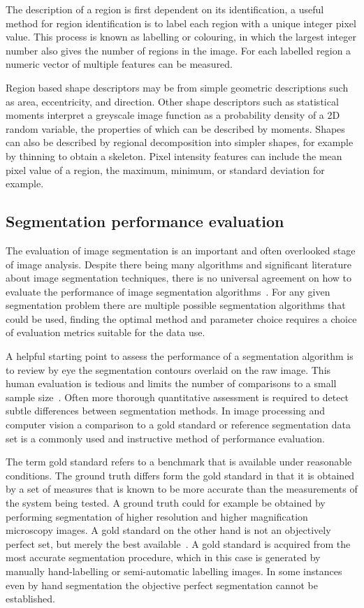 The description of a region is first dependent on its identification, a useful method for region identification is to label each region with a unique integer pixel value. This process is known as labelling or colouring, in which the largest integer number also gives the number of regions in the image. For each labelled region a numeric vector of multiple features can be measured.

Region based shape descriptors may be from simple geometric descriptions such as area, eccentricity, and direction. Other shape descriptors such as statistical moments interpret a greyscale image function as a probability density of a 2D random variable, the properties of which can be described by moments. Shapes can also be described by regional decomposition into simpler shapes, for example by thinning to obtain a skeleton. Pixel intensity features can include the mean pixel value of a region, the maximum, minimum, or standard deviation for example.

\subsection{Segmentation performance evaluation}
\label{introduction:image_processing:performance_evaluation}
The evaluation of image segmentation is an important and often overlooked stage of image analysis. Despite there being many algorithms and significant literature about image segmentation techniques, there is no universal agreement on how to evaluate the performance of image segmentation algorithms~\cite{Benes2015}. For any given segmentation problem there are multiple possible segmentation algorithms that could be used, finding the optimal method and parameter choice requires a choice of evaluation metrics suitable for the data use.

A helpful starting point to assess the performance of a segmentation algorithm is to review by eye the segmentation contours overlaid on the raw image. This human evaluation is tedious and limits the number of comparisons to a small sample size~\cite{Zhang2008}. Often more thorough quantitative assessment is required to detect subtle differences between segmentation methods. In image processing and computer vision a comparison to a gold standard or reference segmentation data set is a commonly used and instructive method of performance evaluation.

The term gold standard refers to a benchmark that is available under reasonable conditions. The ground truth differs form the gold standard in that it is obtained by a set of measures that is known to be more accurate than the measurements of the system being tested. A ground truth could for example be obtained by performing segmentation of higher resolution and higher magnification microscopy images. A gold standard on the other hand is not an objectively perfect set, but merely the best available~\cite{Cardoso2014}. A gold standard is acquired from the most accurate segmentation procedure, which in this case is generated by manually hand-labelling or semi-automatic labelling images. In some instances even by hand segmentation the objective perfect segmentation cannot be established.

